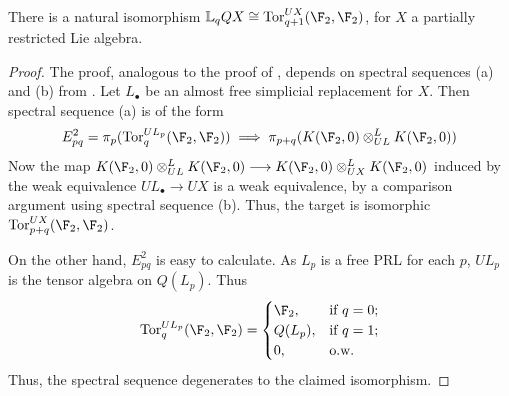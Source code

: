 \documentclass[10pt]{article}
\newcommand{\derived}{\mathbb{L}}
\begin{document}
\begin{PRlieKoszulCxCalcOriginalWithSSeq}
\begin{prop}
There is a natural isomorphism $\derived_q QX\cong \Tor^{UX}_{q+1}(\F_2,\F_2)$, for $X$ a partially restricted Lie algebra.
\end{prop}
\begin{proof}
The proof, analogous to the proof of \cite[3.5]{PriddySimplicialLie.pdf}, depends on spectral sequences (a) and (b) from \cite[II.6.6]{QuillenHomAlg.pdf}. Let $L_\bullet$ be an almost free simplicial replacement for $X$. Then spectral sequence (a) is of the form
\[E^2_{pq}=\pi_p(\Tor^{UL_p}_q(\F_2,\F_2))\implies \pi_{p+q}(K(\F_2,0)\otimes_{UL}^{L}K(\F_2,0))\]
Now the map $K(\F_2,0)\otimes_{UL}^{L}K(\F_2,0) \to K(\F_2,0)\otimes_{UX}^{L}K(\F_2,0)$ induced by the weak equivalence $UL_\bullet\to UX$ is a weak equivalence, by a comparison argument using spectral sequence (b). Thus, the target is isomorphic $\Tor^{UX}_{p+q}(\F_2,\F_2)$.

On the other hand, $E^2_{pq}$ is easy to calculate. As $L_p$ is a free PRL for each $p$, $UL_p$ is the tensor algebra on $Q(L_p)$. Thus
\[\Tor^{UL_p}_q(\F_2,\F_2)=\begin{cases}
\F_2,&\textup{if }q=0;\\
Q(L_p),&\textup{if }q=1;\\
0,&\textup{o.w. }
\end{cases}
\]
Thus, the spectral sequence degenerates to the claimed isomorphism.
\end{proof}


\end{PRlieKoszulCxCalcOriginalWithSSeq}
\end{document}

